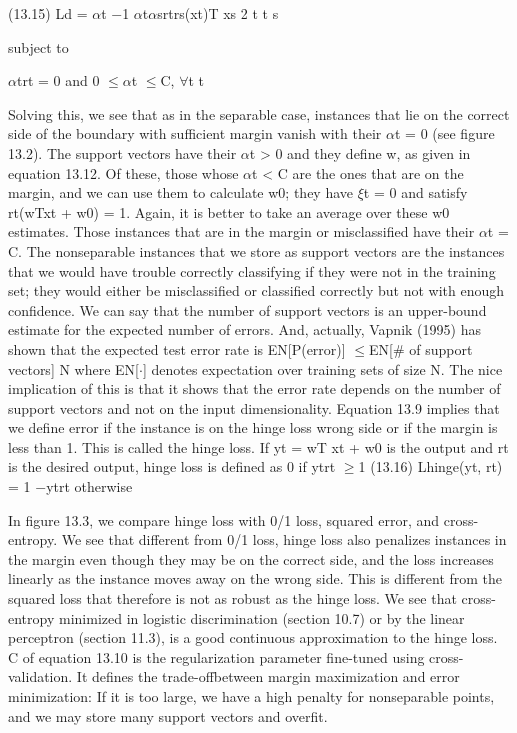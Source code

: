(13.15) Ld = $\alpha$t $-$1 $\alpha$t$\alpha$srtrs(xt)T xs 2 t t s

subject to

$\alpha$trt = 0 and 0 $\leq$$\alpha$t $\leq$C, $\forall$t t

Solving this, we see that as in the separable case, instances that lie on the correct side of the boundary with sufficient margin vanish with their $\alpha$t = 0 (see figure 13.2). The support vectors have their $\alpha$t > 0 and they define w, as given in equation 13.12. Of these, those whose $\alpha$t < C are the ones that are on the margin, and we can use them to calculate w0; they have $\xi$t = 0 and satisfy rt(wTxt + w0) = 1. Again, it is better to take an average over these w0 estimates. Those instances that are in the margin or misclassified have their $\alpha$t = C. The nonseparable instances that we store as support vectors are the instances that we would have trouble correctly classifying if they were not in the training set; they would either be misclassified or classified correctly but not with enough confidence. We can say that the number of support vectors is an upper-bound estimate for the expected number of errors. And, actually, Vapnik (1995) has shown that the expected test error rate is EN[P(error)] $\leq$EN[\# of support vectors] N where EN[$\cdot$] denotes expectation over training sets of size N. The nice implication of this is that it shows that the error rate depends on the number of support vectors and not on the input dimensionality. Equation 13.9 implies that we define error if the instance is on the hinge loss wrong side or if the margin is less than 1. This is called the hinge loss. If yt = wT xt + w0 is the output and rt is the desired output, hinge loss is defined as 0 if ytrt $\geq$1 (13.16) Lhinge(yt, rt) = 1 $-$ytrt otherwise

In figure 13.3, we compare hinge loss with 0/1 loss, squared error, and cross-entropy. We see that different from 0/1 loss, hinge loss also penalizes instances in the margin even though they may be on the correct side, and the loss increases linearly as the instance moves away on the wrong side. This is different from the squared loss that therefore is not as robust as the hinge loss. We see that cross-entropy minimized in logistic discrimination (section 10.7) or by the linear perceptron (section 11.3), is a good continuous approximation to the hinge loss. C of equation 13.10 is the regularization parameter fine-tuned using cross-validation. It defines the trade-offbetween margin maximization and error minimization: If it is too large, we have a high penalty for nonseparable points, and we may store many support vectors and overfit.

